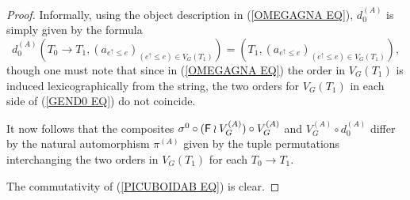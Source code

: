 \documentclass[a4paper,10pt]{article}%
\begin{document}
\begin{proof}
  Informally, using the object description in (\ref{OMEGAGNA EQ}),
  $d_0^{(A)}$ is simply given by the formula
  \begin{equation}\label{GEND0 EQ}
    d_0^{(A)} \left(
      T_0 \to T_1,
      (a_{e^{\uparrow} \leq e})_{(e^{\uparrow} \leq e)\in V_G(T_1)}
    \right)
    =
    \left(
      T_1,
      (a_{e^{\uparrow} \leq e})_{(e^{\uparrow} \leq e)\in V_G(T_1)}
    \right),
  \end{equation}
  though one must note that since in (\ref{OMEGAGNA EQ}) the
  order in $V_G(T_1)$ is induced lexicographically from the string, the two orders for $V_G(T_1)$ in each side of (\ref{GEND0 EQ})
  do not coincide.

  It now follows that the composites 
  $\sigma^0 \circ (\mathsf{F} \wr V_G^{(A)}) \circ V_G^{(A)}$
  and 
  $V_G^{(A)} \circ d_0^{(A)}$
  differ by the natural automorphism $\pi^{(A)}$
  given by the tuple permutations interchanging the two orders in
  $V_G(T_1)$ for each $T_0 \to T_1$.

  The commutativity of (\ref{PICUBOIDAB EQ}) is clear.
\end{proof}
\end{document}

